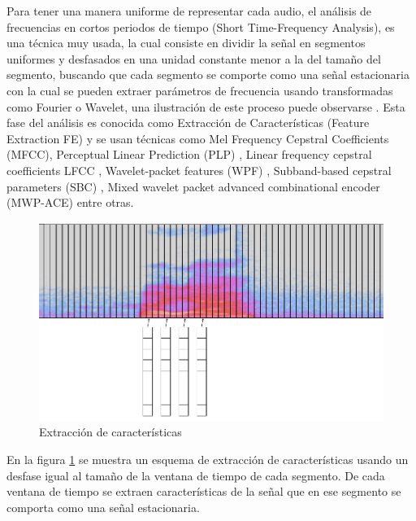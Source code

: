Para tener una manera uniforme de representar cada audio, el análisis de frecuencias en cortos periodos de tiempo (Short Time-Frequency Analysis), es una técnica muy usada, la cual consiste en dividir la señal en segmentos uniformes y desfasados en una unidad constante menor a la del tamaño del segmento, buscando que cada segmento se comporte como una señal estacionaria con la cual se pueden extraer parámetros de frecuencia usando transformadas como Fourier o Wavelet, una ilustración de este proceso puede observarse . Esta fase del análisis es conocida como Extracción de Características (Feature Extraction FE) y se usan técnicas como Mel Frequency Cepstral Coefficients (MFCC)\cite{Davis1980ComparisonSentences}, Perceptual Linear Prediction (PLP) \cite{Hermansky1990PerceptualSpeech}, Linear frequency cepstral coefficients LFCC \cite{Davis1980ComparisonSentences}, Wavelet-packet features (WPF) \cite{Farooq2001MelRecognition}, Subband-based cepstral parameters (SBC) \cite{Sarikaya98waveletpacket}, Mixed wavelet packet advanced combinational encoder (MWP-ACE) \cite{NogueiraWaveletImplants} entre otras.

\begin{figure}[H]

\centering
\caption{Extracción de características}
\label{img:fe}
\includegraphics[scale=0.50]{imagenes/fe.png}
\end{figure}

En la figura \ref{img:fe} se muestra un esquema de extracción de características usando un desfase igual al tamaño de la ventana de tiempo de cada segmento. De cada ventana de tiempo se extraen características de la señal que en ese segmento se comporta como una señal estacionaria.

